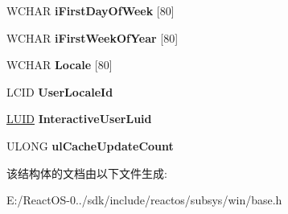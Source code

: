 \begin{DoxyCompactItemize}
W\+C\+H\+AR {\bfseries i\+First\+Day\+Of\+Week} \mbox{[}80\mbox{]}
\item 
\mbox{\label{struct___n_l_s___u_s_e_r___i_n_f_o_a00dc989b77cb259c29a9cc5815c407ae}} 
W\+C\+H\+AR {\bfseries i\+First\+Week\+Of\+Year} \mbox{[}80\mbox{]}
\item 
\mbox{\label{struct___n_l_s___u_s_e_r___i_n_f_o_a075bb930cd490bf578bc884a5f5791e6}} 
W\+C\+H\+AR {\bfseries Locale} \mbox{[}80\mbox{]}
\item 
\mbox{\label{struct___n_l_s___u_s_e_r___i_n_f_o_a0cbecf92331c006eb39b9bcf14c88bf3}} 
L\+C\+ID {\bfseries User\+Locale\+Id}
\item 
\mbox{\label{struct___n_l_s___u_s_e_r___i_n_f_o_acd21ff66820c0a5f61c9d2847863cc5c}} 
\hyperlink{struct___l_u_i_d}{L\+U\+ID} {\bfseries Interactive\+User\+Luid}
\item 
\mbox{\label{struct___n_l_s___u_s_e_r___i_n_f_o_a59159aab5076e6e3a6b9a0dc144e7dd5}} 
U\+L\+O\+NG {\bfseries ul\+Cache\+Update\+Count}
\end{DoxyCompactItemize}


该结构体的文档由以下文件生成\+:\begin{DoxyCompactItemize}
\item 
E\+:/\+React\+O\+S-\/0../sdk/include/reactos/subsys/win/base.\+h\end{DoxyCompactItemize}
